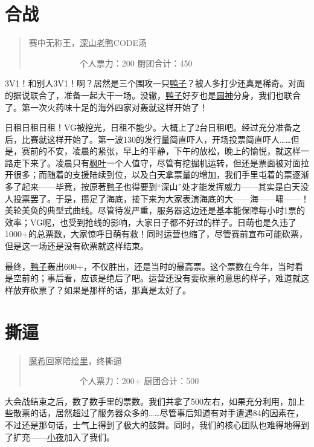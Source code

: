 \chapter{合战}
\begin{quote}
赛中无称王，\uline{深山老鸭}CODE汤

　　　　　　个人票力：200 厨团合计：450
\end{quote}

3V1！和别人3V1！啊？居然是三个围攻一只\uline{鸭子}？被人多打少还真是稀奇。对面的据说联合了，准备一起大干一场。没辙，\uline{鸭子}好歹也是\uline{圆神}分身，我们也联合了。第一次火药味十足的海外四家对轰就这样开始了！

日租日租日租！VG被挖光，日租不能少。大概上了2台日租吧。经过充分准备之后，比赛就这样开始了。第一波130的发行量简直吓人，开场投票简直吓人……但是，赛前的不安，凌晨的紧张，早上的平静，下午的放松，晚上的愉悦，就这样一路走下来了。凌晨只有\uline{枫叶}一个人值守，尽管有挖掘机运转，但还是票面被对面拉开很多；而随着的支援陆续到位，以及白天拿票量的增加，我们手里屯着的票逐渐多了起来——毕竟，按原著\uline{鸭子}也得要到“深山”处才能发挥威力——其实是白天没人投票罢了。于是，攒足了海底，接下来为大家表演海底的大——海——啸——！美轮美奂的典型式曲线。尽管待发严重，服务器这边还是基本能保障每小时1票的效率；VG呢，也受到抢线的影响，大家日子都不好过的样子。日萌也是久违了1000+的总票数，大家惊呼日萌有救！同时运营也缩了，尽管赛前宣布可能砍票，但是这一场还是没有砍票就这样结束。

最终，\uline{鸭子}轰出600+，不仅胜出，还是当时的最高票。这个票数在今年，当时看是空前的；事后看，应该是绝后了吧。运营还没有要砍票的意思的样子，难道就这样放弃砍票了？如果是那样的话，那真是太好了。

\chapter{撕逼}
\begin{quote}
\uline{魔希}回家陪\uline{绘里}，终撕逼

　　　　　　个人票力：200+ 厨团合计：500
\end{quote}

大会战结束之后，数了数手里的票数。我们共拿了500左右，如果充分利用，加上些散票的话，居然超过了服务器众多的……尽管事后知道有对手遭遇84的因素在，不过还是那句话，士气上得到了极大的鼓舞。同时，我们的核心团队也难得地得到了扩充——\uline{小夜}加入了我们。

